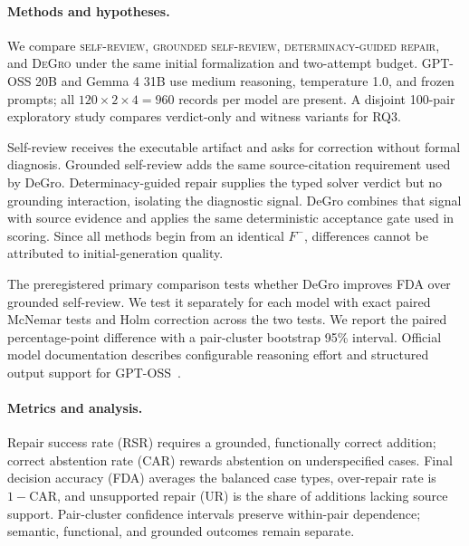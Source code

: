 \documentclass[sigconf,anonymous]{aamas}
\begin{document}
\paragraph{Methods and hypotheses.}
We compare \textsc{self-review}, \textsc{grounded self-review}, \textsc{determinacy-guided repair}, and \textsc{DeGro} under the same initial formalization and two-attempt budget.  GPT-OSS 20B and Gemma 4 31B use medium reasoning, temperature 1.0, and frozen prompts; all $120\times2\times4=960$ records per model are present.  A disjoint 100-pair exploratory study compares verdict-only and witness variants for RQ3.

Self-review receives the executable artifact and asks for correction without formal diagnosis.  Grounded self-review adds the same source-citation requirement used by DeGro.  Determinacy-guided repair supplies the typed solver verdict but no grounding interaction, isolating the diagnostic signal.  DeGro combines that signal with source evidence and applies the same deterministic acceptance gate used in scoring.  Since all methods begin from an identical $F^-$, differences cannot be attributed to initial-generation quality.

The preregistered primary comparison tests whether DeGro improves FDA over grounded self-review.  We test it separately for each model with exact paired McNemar tests and Holm correction across the two tests.  We report the paired percentage-point difference with a pair-cluster bootstrap 95\% interval.  Official model documentation describes configurable reasoning effort and structured output support for GPT-OSS~\cite{openai2025gptoss}.

\paragraph{Metrics and analysis.}
Repair success rate (RSR) requires a grounded, functionally correct addition; correct abstention rate (CAR) rewards abstention on underspecified cases.  Final decision accuracy (FDA) averages the balanced case types, over-repair rate is $1-\mathrm{CAR}$, and unsupported repair (UR) is the share of additions lacking source support.  Pair-cluster confidence intervals preserve within-pair dependence; semantic, functional, and grounded outcomes remain separate.
\end{document}
